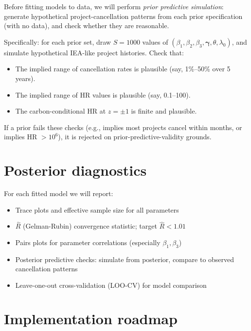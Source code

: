 \documentclass[11pt,a4paper]{article}
\begin{document}
Before fitting models to data, we will perform \emph{prior predictive simulation}:
generate hypothetical project-cancellation patterns from each prior specification (with no data), and check whether they are reasonable.

Specifically: for each prior set, draw $S = 1000$ values of $(\beta_1, \beta_2, \beta_3, \bm\gamma, \theta, \lambda_0)$, and simulate hypothetical IEA-like project histories. Check that:

\begin{itemize}
  \item The implied range of cancellation rates is plausible (say, 1\%--50\% over 5 years).
  \item The implied range of HR values is plausible (say, 0.1--100).
  \item The carbon-conditional HR at $z = \pm 1$ is finite and plausible.
\end{itemize}

If a prior fails these checks (e.g., implies most projects cancel within months, or implies HR $> 10^6$), it is rejected on prior-predictive-validity grounds.

\section{Posterior diagnostics}

For each fitted model we will report:

\begin{itemize}
  \item Trace plots and effective sample size for all parameters
  \item $\hat{R}$ (Gelman-Rubin) convergence statistic; target $\hat{R} < 1.01$
  \item Pairs plots for parameter correlations (especially $\beta_1, \beta_3$)
  \item Posterior predictive checks: simulate from posterior, compare to observed cancellation patterns
  \item Leave-one-out cross-validation (LOO-CV) for model comparison
\end{itemize}

\section{Implementation roadmap}
\end{document}
